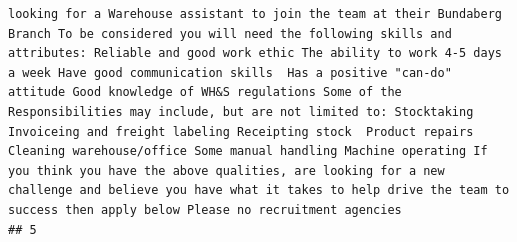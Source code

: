 \documentclass[11pt,a4paper,]{article}
\begin{document}
\begin{verbatim}
looking for a Warehouse assistant to join the team at their Bundaberg Branch To be considered you will need the following skills and attributes: Reliable and good work ethic The ability to work 4-5 days a week Have good communication skills  Has a positive "can-do" attitude Good knowledge of WH&S regulations Some of the Responsibilities may include, but are not limited to: Stocktaking Invoiceing and freight labeling Receipting stock  Product repairs Cleaning warehouse/office Some manual handling Machine operating If you think you have the above qualities, are looking for a new challenge and believe you have what it takes to help drive the team to success then apply below Please no recruitment agencies
## 5                                                                                                                                                                                                                                                                                                                                                                                                                                                                                                                                                                                                                                                                                                                                                                                                                                                                                                                                                                                                                                                                                                                                                                                                                                                                                                                                                                                                                                                                                                                                                                                                                                                                                                                                                                                                                                                                                                                                                                                                                                                                                                                                                                                                                                                                                                                                                                                                                                                                                                                                                                                                                                                                                                            
\end{verbatim}
\end{document}

